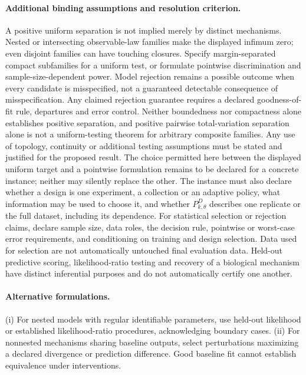 \documentclass[11pt]{article}
\begin{document}
\paragraph{Additional binding assumptions and resolution criterion.} A positive uniform separation is not implied merely by distinct mechanisms. Nested or intersecting observable-law families make the displayed infimum zero; even disjoint families can have touching closures. Specify margin-separated compact subfamilies for a uniform test, or formulate pointwise discrimination and sample-size-dependent power. Model rejection remains a possible outcome when every candidate is misspecified, not a guaranteed detectable consequence of misspecification. Any claimed rejection guarantee requires a declared goodness-of-fit rule, departures and error control. Neither boundedness nor compactness alone establishes positive separation, and positive pairwise total-variation separation alone is not a uniform-testing theorem for arbitrary composite families. Any use of topology, continuity or additional testing assumptions must be stated and justified for the proposed result. The choice permitted here between the displayed uniform target and a pointwise formulation remains to be declared for a concrete instance; neither may silently replace the other. The instance must also declare whether a design is one experiment, a collection or an adaptive policy, what information may be used to choose it, and whether $P_{k,\theta}^D$ describes one replicate or the full dataset, including its dependence. For statistical selection or rejection claims, declare sample size, data roles, the decision rule, pointwise or worst-case error requirements, and conditioning on training and design selection. Data used for selection are not automatically untouched final evaluation data. Held-out predictive scoring, likelihood-ratio testing and recovery of a biological mechanism have distinct inferential purposes and do not automatically certify one another.

\paragraph{Alternative formulations.} (i) For nested models with regular identifiable parameters, use held-out likelihood or established likelihood-ratio procedures, acknowledging boundary cases. (ii) For nonnested mechanisms sharing baseline outputs, select perturbations maximizing a declared divergence or prediction difference. Good baseline fit cannot establish equivalence under interventions.
\end{document}
